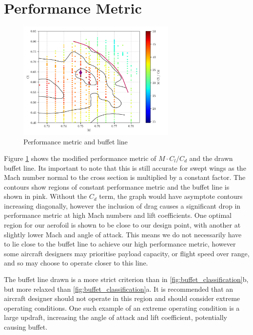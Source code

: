 \documentclass{article}
\begin{document}
\section{Performance Metric}

\begin{figure}[H]
    \centering
    \includegraphics[width=0.7\textwidth]{figures/performance_metric.png}
    \caption{Performance metric and buffet line}
    \label{fig:performance_metric}
\end{figure}

Figure \ref{fig:performance_metric} shows the modified performance metric of $M \cdot C_l/C_d$ and the drawn buffet line.
Its important to note that this is still accurate for swept wings as the Mach number normal to the cross section is multiplied by a constant factor.
The contours show regions of constant performance metric and the buffet line is shown in pink.
Without the $C_d$ term, the graph would have asymptote contours increasing diagonally, however the inclusion of drag
causes a significant drop in performance metric at high Mach numbers and lift coefficients.
One optimal region for our aerofoil is shown to be close to our design point, with another at slightly lower Mach and angle of attack.
This means we do not necessarily have to lie close to the buffet line to achieve our high performance metric, however some aircraft designers
may prioritise payload capacity, or flight speed over range, and so may choose to operate closer to this line.

The buffet line drawn is a more strict criterion than in \ref{fig:buffet_classification}b, but more relaxed than \ref{fig:buffet_classification}a.
It is recommended that an aircraft designer should not operate in this region and should consider extreme operating conditions.
One such example of an extreme operating condition is a large updraft, increasing the angle of attack and lift coefficient, potentially causing buffet.
\end{document}
